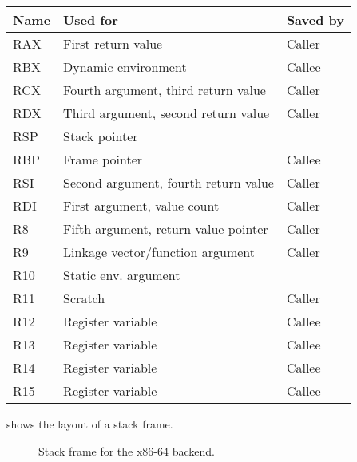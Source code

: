 \begin{tabular}{|l|l|l|}
\hline
Name & Used for & Saved by\\
\hline
\hline
RAX & First return value & Caller\\
RBX & Dynamic environment & Callee\\
RCX & Fourth argument, third return value & Caller \\
RDX & Third argument, second return value & Caller\\
RSP & Stack pointer &\\
RBP & Frame pointer & Callee\\
RSI & Second argument, fourth return value & Caller\\
RDI & First argument, value count & Caller\\
R8 &  Fifth argument, return value pointer& Caller\\
R9 & Linkage vector/function argument & Caller\\
R10 & Static env. argument &\\
R11 & Scratch & Caller\\
R12 & Register variable & Callee\\
R13 & Register variable & Callee\\
R14 & Register variable & Callee\\
R15 & Register variable & Callee\\
\hline
\end{tabular}

 shows the layout of a stack frame. 

\begin{figure}
\begin{center}
\end{center}
\caption{\label{fig-x86-64-stack-frame}
Stack frame for the x86-64 backend.}
\end{figure}
